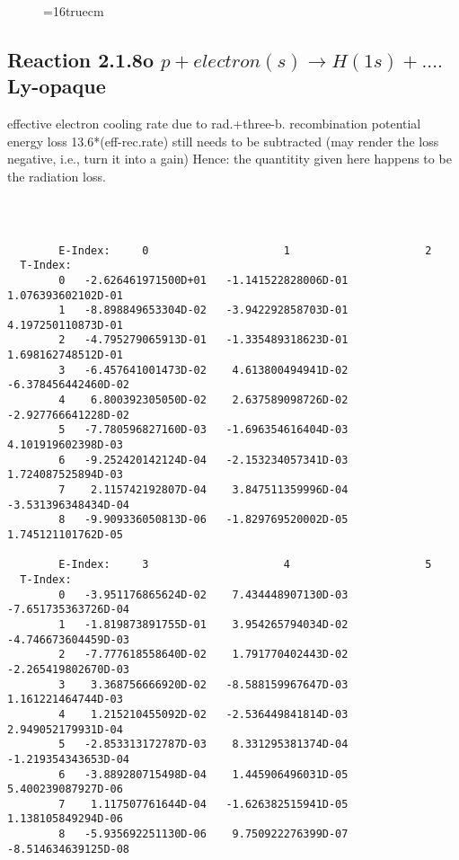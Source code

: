 \documentclass[12pt]{article}
\begin{document}
\begin{figure} \label{2.1.8r}
\epsfxsize=16truecm
\end{figure}
\newpage

\subsection{
  Reaction 2.1.8o $p + electron(s) \rightarrow H(1s) + ....$ Ly-opaque
}

   effective electron cooling rate due to rad.+three-b. recombination
   potential energy loss 13.6*(eff-rec.rate) still needs to be
   subtracted (may render the loss negative, i.e., turn it into a gain)
   Hence: the quantitity given here happens to be the radiation loss.

\begin{small}\begin{verbatim}



        E-Index:     0                     1                     2
  T-Index:
        0   -2.626461971500D+01   -1.141522828006D-01    1.076393602102D-01
        1   -8.898849653304D-02   -3.942292858703D-01    4.197250110873D-01
        2   -4.795279065913D-01   -1.335489318623D-01    1.698162748512D-01
        3   -6.457641001473D-02    4.613800494941D-02   -6.378456442460D-02
        4    6.800392305050D-02    2.637589098726D-02   -2.927766641228D-02
        5   -7.780596827160D-03   -1.696354616404D-03    4.101919602398D-03
        6   -9.252420142124D-04   -2.153234057341D-03    1.724087525894D-03
        7    2.115742192807D-04    3.847511359996D-04   -3.531396348434D-04
        8   -9.909336050813D-06   -1.829769520002D-05    1.745121101762D-05

        E-Index:     3                     4                     5
  T-Index:
        0   -3.951176865624D-02    7.434448907130D-03   -7.651735363726D-04
        1   -1.819873891755D-01    3.954265794034D-02   -4.746673604459D-03
        2   -7.777618558640D-02    1.791770402443D-02   -2.265419802670D-03
        3    3.368756666920D-02   -8.588159967647D-03    1.161221464744D-03
        4    1.215210455092D-02   -2.536449841814D-03    2.949052179931D-04
        5   -2.853313172787D-03    8.331295381374D-04   -1.219354343653D-04
        6   -3.889280715498D-04    1.445906496031D-05    5.400239087927D-06
        7    1.117507761644D-04   -1.626382515941D-05    1.138105849294D-06
        8   -5.935692251130D-06    9.750922276399D-07   -8.514634639125D-08


\end{verbatim}
\end{small}
\end{document}

